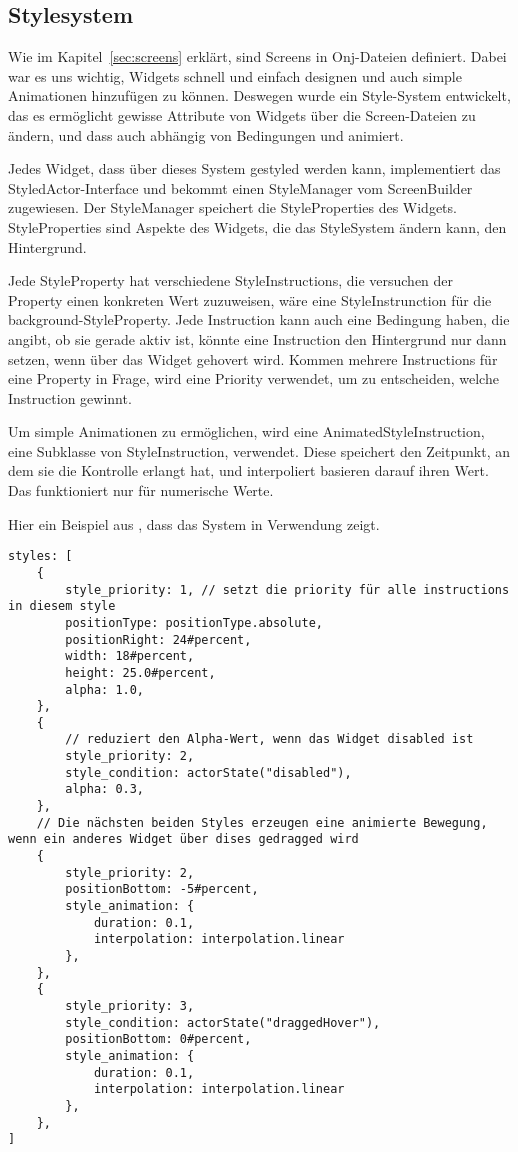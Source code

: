 
\subsection{Stylesystem}\label{subsec:stylesystem}

\renewcommand{\kapitelautor}{Autor: Marvin Kurka}

Wie im Kapitel~\ref{sec:screens} erklärt, sind Screens in Onj-Dateien definiert.
Dabei war es uns wichtig, Widgets schnell und einfach designen und auch simple Animationen hinzufügen zu können.
Deswegen wurde ein Style-System entwickelt, das es ermöglicht gewisse Attribute von Widgets über die Screen-Dateien
zu ändern, und dass auch abhängig von Bedingungen und animiert.

Jedes Widget, dass über dieses System gestyled werden kann, implementiert das StyledActor-Interface und
bekommt einen StyleManager vom ScreenBuilder zugewiesen.
Der StyleManager speichert die StyleProperties des Widgets.
StyleProperties sind Aspekte des Widgets, die das StyleSystem ändern kann, \zB den Hintergrund.

Jede StyleProperty hat verschiedene StyleInstructions, die versuchen der Property einen konkreten Wert zuzuweisen,
\zB {} wäre eine StyleInstrunction für die background-StyleProperty.
Jede Instruction kann auch eine Bedingung haben, die angibt, ob sie gerade aktiv ist, \zB könnte eine Instruction
den Hintergrund nur dann setzen, wenn über das Widget gehovert wird.
Kommen mehrere Instructions für eine Property in Frage, wird eine Priority verwendet, um zu entscheiden, welche
Instruction gewinnt.

Um simple Animationen zu ermöglichen, wird eine AnimatedStyleInstruction, eine Subklasse von StyleInstruction, verwendet.
Diese speichert den Zeitpunkt, an dem sie die Kontrolle erlangt hat, und interpoliert basieren darauf ihren Wert.
Das funktioniert nur für numerische Werte.

Hier ein Beispiel aus , dass das System in Verwendung zeigt.

\begin{verbatim}
styles: [
    {
        style_priority: 1, // setzt die priority für alle instructions in diesem style
        positionType: positionType.absolute,
        positionRight: 24#percent,
        width: 18#percent,
        height: 25.0#percent,
        alpha: 1.0,
    },
    {
        // reduziert den Alpha-Wert, wenn das Widget disabled ist
        style_priority: 2,
        style_condition: actorState("disabled"),
        alpha: 0.3,
    },
    // Die nächsten beiden Styles erzeugen eine animierte Bewegung, wenn ein anderes Widget über dises gedragged wird
    {
        style_priority: 2,
        positionBottom: -5#percent,
        style_animation: {
            duration: 0.1,
            interpolation: interpolation.linear
        },
    },
    {
        style_priority: 3,
        style_condition: actorState("draggedHover"),
        positionBottom: 0#percent,
        style_animation: {
            duration: 0.1,
            interpolation: interpolation.linear
        },
    },
]
\end{verbatim}

